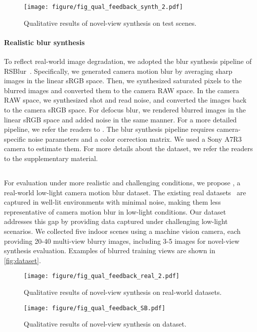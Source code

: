 \begin{figure*}[t]
    \centering
    \texttt{[image: figure/fig\_qual\_feedback\_synth\_2.pdf]}
    \caption{Qualitative results of novel-view synthesis on \SynthDataName{} test scenes.
    }
    \label{fig:qualitative_result1}
\end{figure*}

\paragraph{Realistic blur synthesis}
To reflect real-world image degradation, we adopted the blur synthesis pipeline of RSBlur~\cite{rim_2022_ECCV_original}. 
Specifically, we generated camera motion blur by averaging sharp images in the linear sRGB space.
Then, we synthesized saturated pixels to the blurred images and converted them to the camera RAW space.
In the camera RAW space, we synthesized shot and read noise, and converted the images back to the camera sRGB space.
For defocus blur, we rendered blurred images in the linear sRGB space and added noise in the same manner.
For a more detailed pipeline, we refer the readers to \cite{rim_2022_ECCV_original}.
The blur synthesis pipeline requires camera-specific noise parameters and a color correction matrix.
We used a Sony A7R3 camera to estimate them.
For more details about the \SynthDataName{} dataset, we refer the readers to the supplementary material.

\subsection{\RealDataName{}}
\label{subsec:BlurRF-real}
For evaluation under more realistic and challenging conditions, we propose \RealDataName{}, a real-world low-light camera motion blur dataset. The existing real datasets~\cite{ma2022deblurnerf,lee2023exblurf}  are captured in well-lit environments with minimal noise, making them less representative of camera motion blur in low-light conditions. Our dataset addresses this gap by providing data captured under challenging low-light scenarios. 
We collected five indoor scenes using a machine vision camera, each providing 20-40 multi-view blurry images, including 3-5 images for novel-view synthesis evaluation.
Examples of blurred training views are shown in \cref{fig:dataset}.


\begin{figure*}[t]
    \centering
    \texttt{[image: figure/fig\_qual\_feedback\_real\_2.pdf]}
    \caption{Qualitative results of novel-view synthesis on real-world datasets.
    }
    \label{fig:qualitative_result2}
    \vspace{-2mm}
\end{figure*}

\begin{figure*}[t]
    \centering
    \texttt{[image: figure/fig\_qual\_feedback\_SB.pdf]}
    \caption{Qualitative results of novel-view synthesis on \SBDataName{} dataset.
    }
    \label{fig:same_blur}
    \vspace{-2mm}
\end{figure*}